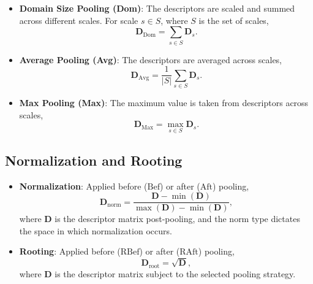 \begin{itemize}
    \item \textbf{Domain Size Pooling (Dom)}: The descriptors are scaled and summed across different scales. For scale $s \in S$, where $S$ is the set of scales,
    \begin{equation}
        \mathbf{D}_{\text{Dom}} = \sum_{s \in S} \mathbf{D}_s.
    \end{equation}
    
    \item \textbf{Average Pooling (Avg)}: The descriptors are averaged across scales,
    \begin{equation}
        \mathbf{D}_{\text{Avg}} = \frac{1}{|S|}\sum_{s \in S} \mathbf{D}_s.
    \end{equation}
    
    \item \textbf{Max Pooling (Max)}: The maximum value is taken from descriptors across scales,
    \begin{equation}
        \mathbf{D}_{\text{Max}} = \max_{s \in S} \mathbf{D}_s.
    \end{equation}
\end{itemize}

\subsection*{Normalization and Rooting}

\begin{itemize}
    \item \textbf{Normalization}: Applied before ($\text{Bef}$) or after ($\text{Aft}$) pooling, 
    \begin{equation}
        \mathbf{D}_{\text{norm}} = \frac{\mathbf{D} - \min(\mathbf{D})}{\max(\mathbf{D}) - \min(\mathbf{D})}, 
    \end{equation}
    where $\mathbf{D}$ is the descriptor matrix post-pooling, and the norm type dictates the space in which normalization occurs.
    
    \item \textbf{Rooting}: Applied before ($\text{RBef}$) or after ($\text{RAft}$) pooling, 
    \begin{equation}
        \mathbf{D}_{\text{root}} = \sqrt{\mathbf{D}},
    \end{equation}
    where $\mathbf{D}$ is the descriptor matrix subject to the selected pooling strategy.
\end{itemize}

